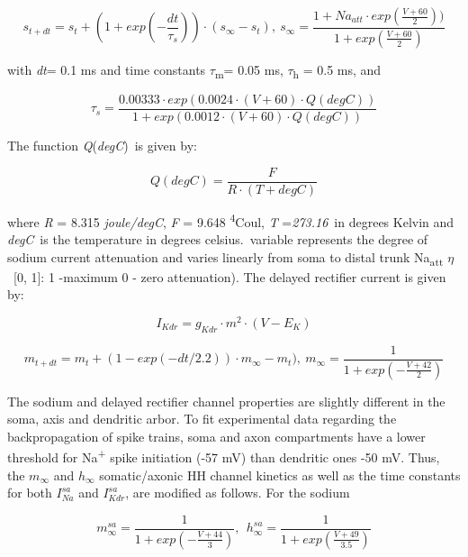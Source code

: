 \documentclass[12pt]{article}
\begin{document}
\begin{equation}
s_{t+dt}=s_t+(1+exp(-\frac{dt}{\tau_s}))\cdot
(s_{\infty}-s_t) ,\ 
s_{\infty}=\frac{1+Na_{att}\cdot exp(\frac{V+60}
		2))}{1+exp(\frac{V+60}{2})}
\end{equation}


with \textit{dt}= 0.1 ms and time constants $\tau$\textsubscript{m}= 0.05 ms, $\tau$\textsubscript{h} = 0.5
ms, and


\begin{equation}
\tau_s=\frac{0.00333\cdot  exp(0.0024 \cdot (V+60)\cdot
		Q(degC))}{1+exp(0.0012 \cdot (V+60)\cdot Q(degC))}
\end{equation}

The function \textit{Q}(\textit{degC})~is given by:
\bigskip

\begin{equation}
Q(degC)= \frac{F}{ R \cdot (T+degC) }
\end{equation}
\bigskip


where \textit{R }=\textit{ }8.315\textit{ joule/degC}, \textit{F }=\textit{ }9.648\textit{ }\textsuperscript{4}Coul,
\textit{T }=\textit{273.16}~in degrees Kelvin and \textit{degC}~is the temperature in degrees celsius.~variable represents the degree of sodium current
attenuation and varies linearly from soma to distal trunk
Na\textsubscript{att} $\eta$~[0, 1]: 1 -maximum 0 - zero attenuation). The delayed rectifier current is given by:


\begin{equation}
I_{Kdr} = g_{Kdr} \cdot m^2 \cdot (V-E_K)
\end{equation}

\begin{equation}
m_{t+dt}=m_t+(1-exp(-dt/2.2) )\cdot m_{\infty}-m_t) ,\ m_{\infty}=\frac{1}{1+exp(-\frac{V+42}{2})}
\end{equation}

The sodium and delayed rectifier channel properties are slightly different in the soma, axis and dendritic arbor. To fit
experimental data regarding the backpropagation of spike trains, soma and axon compartments have a lower threshold for
Na\textsuperscript{+} spike initiation (-57 mV) than dendritic ones -50 mV. Thus, the $m_{\infty}$ and $h_{\infty}$
somatic/axonic HH channel kinetics as well as the time constants for both 
$I_{Na}^{sa}$
and 
$I_{Kdr}^{sa}$,
are modified as follows. For the sodium


\begin{equation}
m_{\infty}^{sa}=\frac {1}{1+exp(-\frac{V+44}{3})} ,\ \ 
h_{\infty}^{sa}=\frac {1}{1+exp(\frac{V+49}{3.5})}
\end{equation}
\end{document}
